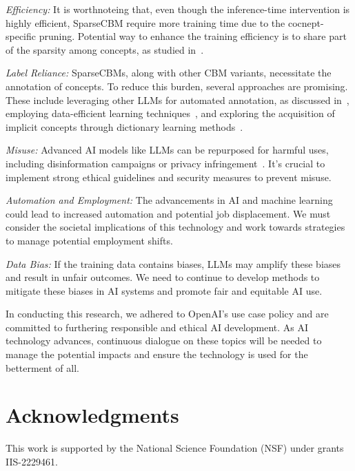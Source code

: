 \documentclass[letterpaper]{article} %
\begin{document}
\textit{Efficiency:} It is worthnoteing that, even though the inference-time intervention is highly efficient, SparseCBM require more training time due to the cocnept-specific pruning. Potential way to enhance the training efficiency is to share part of the sparsity among concepts, as studied in~\citep{wang2020learn,chen2021long}.

\textit{Label Reliance:} SparseCBMs, along with other CBM variants, necessitate the annotation of concepts. To reduce this burden, several approaches are promising. These include leveraging other LLMs for automated annotation, as discussed in~\citep{tan2023cbm,wang2023contrastive}, employing data-efficient learning techniques~\citep{tan2022graph}, and exploring the acquisition of implicit concepts through dictionary learning methods~\citep{wang2022neural}.
 

\textit{Misuse:} Advanced AI models like LLMs can be repurposed for harmful uses, including disinformation campaigns or privacy infringement~\cite{jiang2023disinformation,chen2023combating}. It's crucial to implement strong ethical guidelines and security measures to prevent misuse.

\textit{Automation and Employment:} The advancements in AI and machine learning could lead to increased automation and potential job displacement. We must consider the societal implications of this technology and work towards strategies to manage potential employment shifts.

\textit{Data Bias:} If the training data contains biases, LLMs may amplify these biases and result in unfair outcomes. We need to continue to develop methods to mitigate these biases in AI systems and promote fair and equitable AI use.

In conducting this research, we adhered to OpenAI's use case policy and are committed to furthering responsible and ethical AI development. As AI technology advances, continuous dialogue on these topics will be needed to manage the potential impacts and ensure the technology is used for the betterment of all.

\section*{Acknowledgments}
This work is supported by the National Science Foundation (NSF) under grants IIS-2229461.

\end{document}
